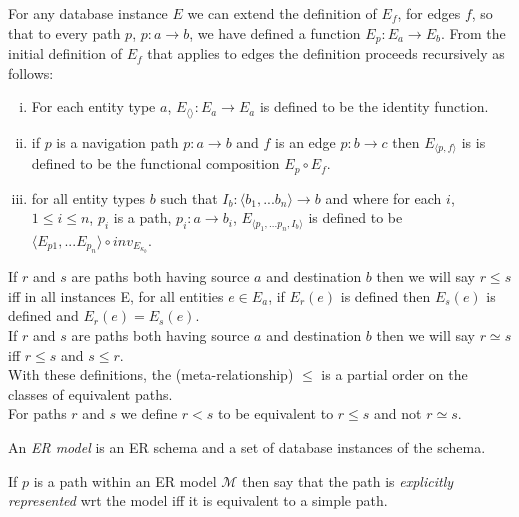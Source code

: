 \documentclass[10pt,a4paper]{article}
\newcommand{\term}[1]{\textit{{#1}}}
\newcommand{\genericmodel}{\mathcal{M}}
\begin{document}
\noindent For any database instance $E$ we can  extend  the definition of
$E_f$, for edges $f$,  so that to every path $p$, $p: a \rightarrow b$,  we have defined a function $E_p: E_a \rightarrow E_b$. From the initial definition of $E_f$ that applies to 
edges the definition proceeds recursively as follows: 
\begin{enumerate} [(i)]
\item{  For each entity type $a$, $E_{\langle \rangle}: E_a \rightarrow E_a$ is defined to be the identity function.
}

\item{   if $p$ is a navigation path $p: a \rightarrow b$ and $f$ is an edge $p: b \rightarrow c$ then $E_{\langle p,f \rangle}$ is 
is defined to be the functional composition $E_p \circ E_f$.
}

\item{ for all entity types $b$ such that $I_b: \langle b_1,...b_n\rangle \rightarrow b$ and where
for each $i$, $1 \leq i \leq n$, $p_i$ is a path, $p_i: a \rightarrow b_i$, $E_{\langle p_1,...p_n,I_b\rangle}$ is defined to be 
$\langle E_{p1},...E_{p_n} \rangle \circ inv_{E_{\kappa_b}}$.
}
\end{enumerate}

\noindent If $r$ and $s$ are paths both having source $a$ and destination $b$ then we will say $r \leq s$ iff in all instances E, for all 
entities $e \in E_a$, if $E_r(e)$ is defined then $E_s(e)$ is defined and $E_r(e)=E_s(e)$. \\

\noindent If $r$ and $s$ are paths both having source $a$ and destination $b$ then we will say $r \simeq s$ iff $r \leq s$ and $s \leq r$. \\

\noindent With these definitions,  the (meta-relationship) $\leq$ is a partial order on the classes of equivalent paths. \\

\noindent For paths $r$ and $s$ we define $r < s$ to be equivalent to $r \leq s$ and not $r \simeq s$. \\

\begin{definition}
\noindent An \term{ER model} is an ER schema and a set of database instances of the schema. \\
\end{definition}

\noindent If $p$ is a path within an ER model $\genericmodel$ then say that the path is \term{explicitly represented} wrt the model iff it is equivalent to a simple path. \\
\end{document}
